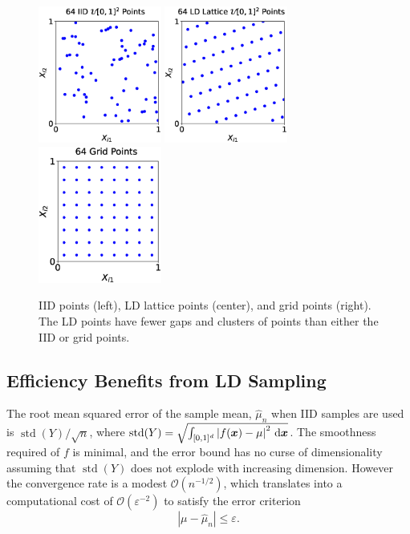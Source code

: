 \documentclass[11pt]{NSFamsart}
\DeclareMathOperator{\std}{std}
\newcommand{\cube}{[0,1]^d}
\newcommand{\bx}{{\boldsymbol{x}}}
\def\dif{\textup{d}}
\def\abs#1{\ensuremath{\left \lvert #1 \right \rvert}}
\newcommand{\Order}{\mathcal{O}}
\newcommand{\hmu}{\hat{\mu}}
\begin{document}
\begin{figure}[H]
	\centering
	\includegraphics[height = 4.5cm]{ProgramsImages/iid_scatter.eps} \quad
	\includegraphics[height = 4.5cm]{ProgramsImages/lattice_scatter.eps} \quad
	\includegraphics[height = 4.5cm]{ProgramsImages/grid_scatter.eps}
	\caption{IID points (left), LD lattice points (center), and grid points (right).  The LD points have fewer gaps and clusters of points than either the IID or grid points. \label{fig:iid_vs_ld}}
\end{figure}

\subsection{Efficiency Benefits from LD Sampling} \label{sec:eff_benefits}
The root mean squared error of the sample mean, $\hmu_n$ when IID samples are used is
$\std(Y)/\sqrt{n}$, where $\std(Y) = \sqrt{\int_{\cube} \abs{f(\bx) - \mu}^2 \, \dif \bx}$.  The smoothness required of $f$ is minimal, and the error bound has no curse of dimensionality assuming that $\std(Y)$ does not explode with increasing dimension.  However the convergence rate is a modest $\Order(n^{-1/2})$, which translates into a computational cost of $\Order(\varepsilon^{-2})$ to satisfy the error criterion
\begin{equation} \label{eq:error_crit}
	\abs{\mu -\hmu_n} \le \varepsilon.
\end{equation}
\end{document}
